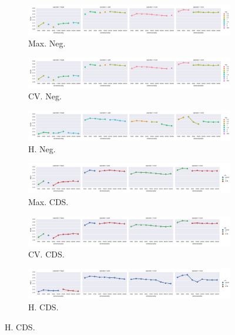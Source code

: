 \begin{landscape}
\begin{figure}
  \begin{subfigure}[t]{0.49\textwidth}
    \includegraphics[width=\textwidth]{supplement/figures/KS14-max_-selection-neg}
    \caption{Max. Neg.}
    \label{fig:}
  \end{subfigure}
  \begin{subfigure}[t]{0.49\textwidth}
    \includegraphics[width=\textwidth]{supplement/figures/KS14-cross_validation-selection-neg}
    \caption{CV. Neg.}
    \label{fig:}
  \end{subfigure}
  \begin{subfigure}[t]{0.49\textwidth}
    \includegraphics[width=\textwidth]{supplement/figures/KS14-heuristics-selection-neg}
    \caption{H. Neg.}
    \label{fig:}
  \end{subfigure}

  \begin{subfigure}[t]{0.49\textwidth}
    \includegraphics[width=\textwidth]{supplement/figures/KS14-max_-selection-cds}
    \caption{Max. CDS.}
    \label{fig:}
  \end{subfigure}
  \begin{subfigure}[t]{0.49\textwidth}
    \includegraphics[width=\textwidth]{supplement/figures/KS14-cross_validation-selection-cds}
    \caption{CV. CDS.}
    \label{fig:}
  \end{subfigure}
  \begin{subfigure}[t]{0.49\textwidth}
    \includegraphics[width=\textwidth]{supplement/figures/KS14-heuristics-selection-cds}
    \caption{H. CDS.}
    \label{fig:}
  \end{subfigure}


\end{figure}
\end{landscape}
